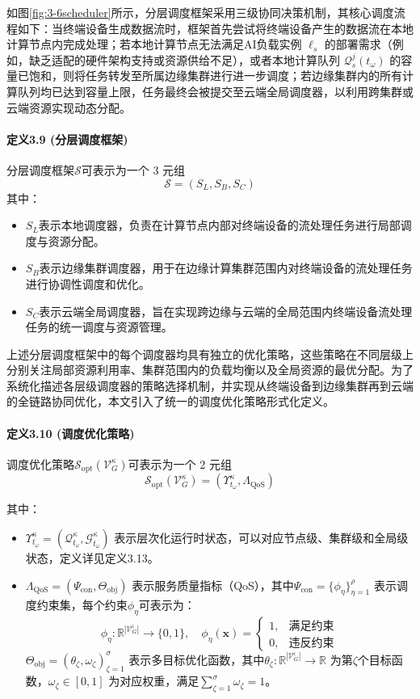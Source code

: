 如图\ref{fig:3-6scheduler}所示，分层调度框架采用三级协同决策机制，其核心调度流程如下：当终端设备生成数据流时，框架首先尝试将终端设备产生的数据流在本地计算节点内完成处理；若本地计算节点无法满足AI负载实例 $\ell_s$ 的部署需求（例如，缺乏适配的硬件架构支持或资源供给不足），或者本地计算队列 $\mathcal{Q}_s^j(t_\omega)$ 的容量已饱和，则将任务转发至所属边缘集群进行进一步调度；若边缘集群内的所有计算队列均已达到容量上限，任务最终会被提交至云端全局调度器，以利用跨集群或云端资源实现动态分配。

\paragraph{定义3.9 (分层调度框架)} 分层调度框架$\mathcal{S}$可表示为一个 3 元组
\[
\mathcal{S} = (S_L, S_B, S_C)
\]
其中：
\begin{itemize}
    \item $S_L$表示本地调度器，负责在计算节点内部对终端设备的流处理任务进行局部调度与资源分配。
    \item $S_B$表示边缘集群调度器，用于在边缘计算集群范围内对终端设备的流处理任务进行协调性调度和优化。
    \item $S_C$表示云端全局调度器，旨在实现跨边缘与云端的全局范围内终端设备流处理任务的统一调度与资源管理。
\end{itemize}

上述分层调度框架中的每个调度器均具有独立的优化策略，这些策略在不同层级上分别关注局部资源利用率、集群范围内的负载均衡以及全局资源的最优分配。为了系统化描述各层级调度器的策略选择机制，并实现从终端设备到边缘集群再到云端的全链路协同优化，本文引入了统一的调度优化策略形式化定义。

\paragraph{定义3.10 (调度优化策略)} 调度优化策略$\mathcal{S}_{\text{opt}}(\mathcal{V}_G^κ)$可表示为一个 2 元组
\[
\mathcal{S}_{\text{opt}}(\mathcal{V}_G^κ) = (\Upsilon_{t_\omega}^κ, \Lambda_{\text{QoS}})
\]

其中：
\begin{itemize}
    \item $\Upsilon_{t_\omega}^κ = (\mathcal{Q}_{t_\omega}^κ, \mathcal{G}_{t_\omega}^κ)$ 表示层次化运行时状态，可以对应节点级、集群级和全局级状态，定义详见定义3.13。
    \item $\Lambda_{\text{QoS}} = (\Psi_{\text{con}}, \Theta_{\text{obj}})$ 表示服务质量指标（QoS），其中$\Psi_{\text{con}} = \{\phi_\eta\}_{\eta=1}^\rho$ 表示调度约束集，每个约束$\phi_\eta$可表示为：
        \[
        \phi_\eta: \mathbb{R}^{|\mathcal{V}_G^\iota|} \to \{0,1\}, \quad \phi_\eta(\mathbf{x}) = 
        \begin{cases}
            1, & \text{满足约束} \\
            0, & \text{违反约束}
        \end{cases}
        \]
    $\Theta_{\text{obj}} = (\theta_\zeta, \omega_\zeta)_{\zeta=1}^\sigma$ 表示多目标优化函数，其中$\theta_\zeta: \mathbb{R}^{|\mathcal{V}_G^\iota|} \to \mathbb{R}$ 为第$\zeta$个目标函数，$\omega_\zeta \in [0,1]$ 为对应权重，满足$\sum_{\zeta=1}^\sigma \omega_\zeta = 1$。
\end{itemize}

